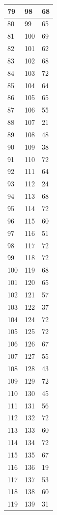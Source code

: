 \begin{tabular}{p{}p{}p{}}
\hline
79 & 98 & 68 \\
\hline
80 & 99 & 65 \\
\hline
81 & 100 & 69 \\
\hline
82 & 101 & 62 \\
\hline
83 & 102 & 68 \\
\hline
84 & 103 & 72 \\
\hline
85 & 104 & 64 \\
\hline
86 & 105 & 65 \\
\hline
87 & 106 & 55 \\
\hline
88 & 107 & 21 \\
\hline
89 & 108 & 48 \\
\hline
90 & 109 & 38 \\
\hline
91 & 110 & 72 \\
\hline
92 & 111 & 64 \\
\hline
93 & 112 & 24 \\
\hline
94 & 113 & 68 \\
\hline
95 & 114 & 72 \\
\hline
96 & 115 & 60 \\
\hline
97 & 116 & 51 \\
\hline
98 & 117 & 72 \\
\hline
99 & 118 & 72 \\
\hline
100 & 119 & 68 \\
\hline
101 & 120 & 65 \\
\hline
102 & 121 & 57 \\
\hline
103 & 122 & 37 \\
\hline
104 & 124 & 72 \\
\hline
105 & 125 & 72 \\
\hline
106 & 126 & 67 \\
\hline
107 & 127 & 55 \\
\hline
108 & 128 & 43 \\
\hline
109 & 129 & 72 \\
\hline
110 & 130 & 45 \\
\hline
111 & 131 & 56 \\
\hline
112 & 132 & 72 \\
\hline
113 & 133 & 60 \\
\hline
114 & 134 & 72 \\
\hline
115 & 135 & 67 \\
\hline
116 & 136 & 19 \\
\hline
117 & 137 & 53 \\
\hline
118 & 138 & 60 \\
\hline
119 & 139 & 31 \\

\end{tabular}

